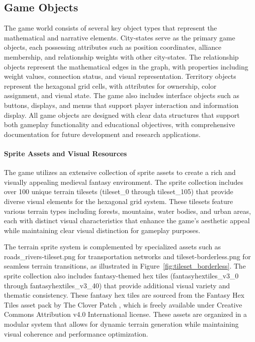 \documentclass[english]{tudscrreprt}
\begin{document}
\subsection{Game Objects}
The game world consists of several key object types that represent the mathematical and narrative elements. City-states serve as the primary game objects, each possessing attributes such as position coordinates, alliance membership, and relationship weights with other city-states. The relationship objects represent the mathematical edges in the graph, with properties including weight values, connection status, and visual representation. Territory objects represent the hexagonal grid cells, with attributes for ownership, color assignment, and visual state. The game also includes interface objects such as buttons, displays, and menus that support player interaction and information display. All game objects are designed with clear data structures that support both gameplay functionality and educational objectives, with comprehensive documentation for future development and research applications.

\paragraph{Sprite Assets and Visual Resources}
The game utilizes an extensive collection of sprite assets to create a rich and visually appealing medieval fantasy environment. The sprite collection includes over 100 unique terrain tilesets (tileset\_0 through tileset\_105) that provide diverse visual elements for the hexagonal grid system. These tilesets feature various terrain types including forests, mountains, water bodies, and urban areas, each with distinct visual characteristics that enhance the game's aesthetic appeal while maintaining clear visual distinction for gameplay purposes.

The terrain sprite system is complemented by specialized assets such as roads\_rivers-tileset.png for transportation networks and tileset-borderless.png for seamless terrain transitions, as illustrated in Figure~\ref{fig:tileset_borderless}. The sprite collection also includes fantasy-themed hex tiles (fantasyhextiles\_v3\_0 through fantasyhextiles\_v3\_40) that provide additional visual variety and thematic consistency. These fantasy hex tiles are sourced from the Fantasy Hex Tiles asset pack by The Clover Patch \cite{fantasyhextiles}, which is freely available under Creative Commons Attribution v4.0 International license. These assets are organized in a modular system that allows for dynamic terrain generation while maintaining visual coherence and performance optimization.
\end{document}
